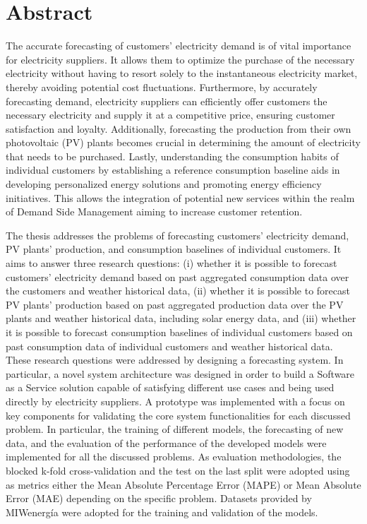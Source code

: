 \chapter*{Abstract} %
\label{abtract}

\vspace{0.4 cm}

The accurate forecasting of customers' electricity demand is of vital importance for electricity suppliers.
It allows them to optimize the purchase of the necessary electricity without having to resort solely to the instantaneous electricity market, thereby avoiding potential cost fluctuations.
Furthermore, by accurately forecasting demand, electricity suppliers can efficiently offer customers the necessary electricity and supply it at a competitive price, ensuring customer satisfaction and loyalty.
Additionally, forecasting the production from their own photovoltaic (PV) plants becomes crucial in determining the amount of electricity that needs to be purchased.
Lastly, understanding the consumption habits of individual customers by establishing a reference consumption baseline aids in developing personalized energy solutions and promoting energy efficiency initiatives.
This allows the integration of potential new services within the realm of Demand Side Management aiming to increase customer retention.

The thesis addresses the problems of forecasting customers' electricity demand, PV plants' production, and consumption baselines of individual customers.
It aims to answer three research questions:
(i) whether it is possible to forecast customers' electricity demand based on past aggregated consumption data over the customers and weather historical data,
(ii) whether it is possible to forecast PV plants' production based on past aggregated production data over the PV plants and weather historical data, including solar energy data,
and (iii) whether it is possible to forecast consumption baselines of individual customers based on past consumption data of individual customers and weather historical data.
These research questions were addressed by designing a forecasting system.
In particular, a novel system architecture was designed in order to build a Software as a Service solution capable of satisfying different use cases and being used directly by electricity suppliers.
A prototype was implemented with a focus on key components for validating the core system functionalities for each discussed problem.
In particular, the training of different models, the forecasting of new data, and the evaluation of the performance of the developed models were implemented for all the discussed problems.
As evaluation methodologies, the blocked k-fold cross-validation and the test on the last split were adopted using as metrics either the Mean Absolute Percentage Error (MAPE) or Mean Absolute Error (MAE) depending on the specific problem.
Datasets provided by MIWenergía were adopted for the training and validation of the models.

